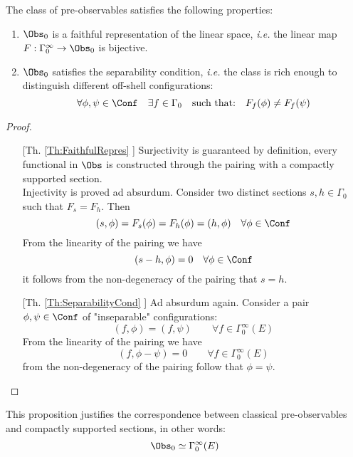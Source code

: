 \documentclass[Main]{subfiles}
\begin{document}
				\begin{proposition}
					The class of pre-observables satisfies the following properties:
					\begin{enumerate}
						\item\label{Th:FaithfulRepres} $\Obs_0$ is a faithful representation of the linear space, \textit{i.e.} the linear map $F: \Gamma_0^\infty \rightarrow \Obs_0$ is bijective.
						\item\label{Th:SeparabilityCond} $\Obs_0$ satisfies the separability condition,
									 \textit{i.e.} the class is rich enough to distinguish different off-shell configurations:
						\begin{displaymath}
							\forall \phi,\psi \in \Conf \quad \exists f \in \Gamma_0 \quad \textrm{such that:} \quad F_f(\phi) \neq F_f(\psi)
						\end{displaymath}
					\end{enumerate}
				\end{proposition}
				\begin{proof}
				\forcenewline
					\begin{itemize}
						\item[[Th. \ref{Th:FaithfulRepres}]]
							Surjectivity is guaranteed by definition, every functional in $\Obs$ is constructed through the pairing with a compactly supported section.\\
							Injectivity is proved ad absurdum.
							Consider two distinct sections $s,h \in \Gamma_0$ such that $F_s = F_h$. Then
							\begin{displaymath}
								 ( s, \phi) = F_s(\phi) = F_h(\phi) = (h, \phi)  \quad \forall \phi \in \Conf
							\end{displaymath}
							From the linearity of the pairing we have
							\begin{displaymath}
								(s-h, \phi) = 0 \quad\forall \phi \in \Conf
							\end{displaymath}
							it follows from the non-degeneracy of the pairing that $s=h$.

						\item[[Th. \ref{Th:SeparabilityCond}]]
							Ad absurdum again.
							Consider a pair $\phi,\psi \in \Conf$ of "inseparable" configurations:
							\begin{displaymath}
								(f, \phi) = (f, \psi) \qquad \forall f \in \Gamma_0^\infty(E)
							\end{displaymath}
							From the linearity of the pairing we have
							\begin{displaymath}
								(f, \phi-\psi) = 0 \qquad \forall f \in \Gamma_0^\infty(E)
							\end{displaymath}
							from the non-degeneracy of the pairing follow that $\phi = \psi$.
					\end{itemize}
				\end{proof}
				This proposition justifies the correspondence between classical pre-observables and compactly supported sections, in other words:
				\begin{displaymath}
					\Obs_0 \simeq \Gamma_0^\infty(E)
				\end{displaymath}
				
\end{document}
